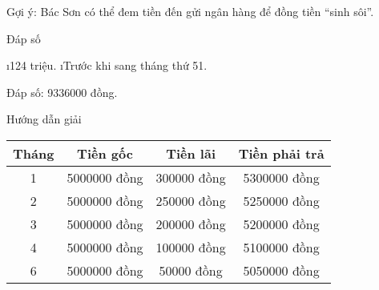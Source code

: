 \begin{Answer}{51}
		Gợi ý: Bác Sơn có thể đem tiền đến gửi ngân hàng để đồng tiền “sinh sôi”.
	
\end{Answer}
\begin{Answer}{52}
		Đáp số
		\begin{enumerate}[a),leftmargin=*]
			\i 124 triệu.
			\i Trước khi sang tháng thứ 51.
		\end{enumerate}
	
\end{Answer}
\begin{Answer}{53}
		Đáp số: 9336000 đồng.
	
\end{Answer}
\begin{Answer}{54}
		Hướng dẫn giải
		\begin{center}
			\begin{tabular}{|c|c|c|c|}
			\hline
			Tháng&Tiền gốc	&Tiền lãi&	Tiền phải trả\\
			\hline
			1&	5000000 đồng&	300000 đồng&	5300000 đồng\\
			\hline
			2&	5000000 đồng&	250000 đồng&	5250000 đồng\\
			\hline
			3&	5000000 đồng&	200000 đồng&	5200000 đồng\\
			\hline
			4&	5000000 đồng&	100000 đồng&	5100000 đồng\\
			\hline
			6&	5000000 đồng&	50000 đồng&	5050000 đồng\\
			\hline
		\end{tabular}
		\end{center}
	
\end{Answer}
